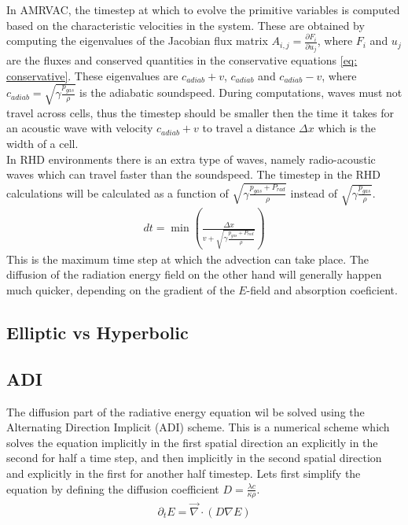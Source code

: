 In AMRVAC, the timestep at which to evolve the primitive variables is computed based on the characteristic velocities in the system. These are obtained by computing the eigenvalues of the Jacobian flux matrix $A_{i,j} = \frac{\partial F_i}{\partial u_j}$, where $F_i$ and $u_j$ are the fluxes and conserved quantities in the conservative equations \eqref{eq: conservative}. These eigenvalues are $c_{adiab} + v$, $c_{adiab}$ and $c_{adiab} - v$, where $c_{adiab} = \sqrt{\gamma\frac{p_{gas}}{\rho}}$ is the adiabatic soundspeed. During computations, waves must not travel across cells, thus the timestep should be smaller then the time it takes for an acoustic wave with velocity $c_{adiab} + v$ to travel a distance $\Delta x$ which is the width of a cell.\\

In RHD environments there is an extra type of waves, namely radio-acoustic waves which can travel faster than the soundspeed. The timestep in the RHD calculations will be calculated as a function of $\sqrt{\gamma\frac{p_{gas} + P_{rad}}{\rho}}$ instead of $\sqrt{\gamma\frac{p_{gas}}{\rho}}$.
\begin{align}
dt = \min \left(\frac{\Delta x}{v + \sqrt{\gamma\frac{p_{gas} + P_{rad}}{\rho}}} \right)
\end{align}
This is the maximum time step at which the advection can take place. The diffusion of the radiation energy field on the other hand will generally happen much quicker, depending on the gradient of the $E$-field and absorption coeficient.

\subsection{Elliptic vs Hyperbolic}
\subsection{ADI}
The diffusion part of the radiative energy equation wil be solved using the Alternating Direction Implicit (ADI) scheme. This is a numerical scheme which solves the equation implicitly in the first spatial direction an explicitly in the second for half a time step, and then implicitly in the second spatial direction and explicitly in the first for another half timestep. Lets first simplify the equation by defining the diffusion coefficient $D = \frac{\lambda c}{\kappa \rho}$. 
\begin{align}
\partial_t E  = \vec{\nabla} \cdot \left(D \nabla E\right) \label{eq: diffusion}
\end{align}

